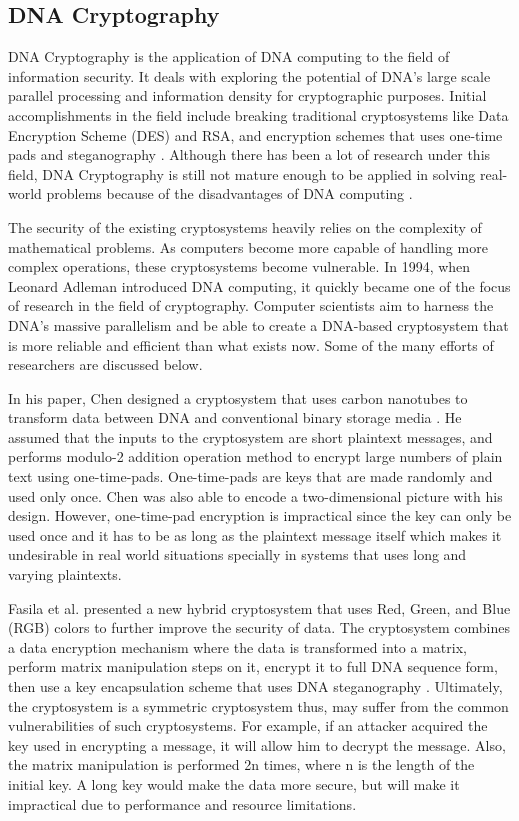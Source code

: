 \subsection{DNA Cryptography}

DNA Cryptography is the application of DNA computing to the field of information security. It deals with exploring the potential of DNA's large scale parallel processing and information density for cryptographic purposes. Initial accomplishments in the field include breaking traditional cryptosystems like Data Encryption Scheme (DES) and RSA, and encryption schemes that uses one-time pads and steganography \cite{dna-computing}. Although there has been a lot of research under this field, DNA Cryptography is still not mature enough to be applied in solving real-world problems because of the disadvantages of DNA computing \cite{eval}.

The security of the existing cryptosystems heavily relies on the complexity of mathematical problems. As computers become more capable of handling more complex operations, these cryptosystems become vulnerable. In 1994, when Leonard Adleman introduced DNA computing, it quickly became one of the focus of research in the field of cryptography. Computer scientists aim to harness the DNA's massive parallelism and be able to create a DNA-based cryptosystem that is more reliable and efficient than what exists now. Some of the many efforts of researchers are discussed below.

In his paper, Chen designed a cryptosystem that uses carbon nanotubes to transform data between DNA and conventional binary storage media \cite{c-nanotubes}. He assumed that the inputs to the cryptosystem are short plaintext messages, and performs modulo-2 addition operation method to encrypt large numbers of plain text using one-time-pads. One-time-pads are keys that are made randomly and used only once. Chen was also able to encode a two-dimensional picture with his design. However, one-time-pad encryption is impractical since the key can only be used once and it has to be as long as the plaintext message itself which makes it undesirable in real world situations specially in systems that uses long and varying plaintexts.

Fasila et al. presented a new hybrid cryptosystem that uses Red, Green, and Blue (RGB) colors to further improve the security of data. The cryptosystem combines a data encryption mechanism where the data is transformed into a matrix, perform matrix manipulation steps on it, encrypt it to full DNA sequence form, then use a key encapsulation scheme that uses DNA steganography \cite{fasila-system}. Ultimately, the cryptosystem is a symmetric cryptosystem thus, may suffer from the common vulnerabilities of such cryptosystems. For example, if an attacker acquired the key used in encrypting a message, it will allow him to decrypt the message. Also, the matrix manipulation is performed 2n times, where n is the length of the initial key. A long key would make the data more secure, but will make it impractical due to performance and resource limitations.


